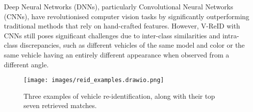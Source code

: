 \documentclass[letterpaper, 10pt, conference]{ieeeconf}
\begin{document}
Deep Neural Networks (DNNs), particularly Convolutional Neural Networks (CNNs), have revolutionised computer vision tasks by significantly outperforming traditional methods that rely on hand-crafted features.
However, V-ReID with CNNs still poses significant challenges due to inter-class similarities and intra-class discrepancies, such as different vehicles of the same model and color or the same vehicle having an entirely different appearance when observed from a different angle.

\begin{figure}[t]
\centerline{{\texttt{[image: images/reid\_examples.drawio.png]}}}
\caption{Three examples of vehicle re-identification, along with their top seven retrieved matches.}
\label{fig:example_reid}
\end{figure}
\end{document}
